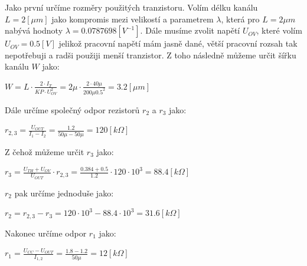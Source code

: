 Jako první určíme rozměry použitých tranzistoru.
Volím délku kanálu \(L = 2 [\mu m]\) jako kompromis mezi velikostí a parametrem \(\lambda\), která pro \(L = 2 \mu m\) nabývá hodnoty \(\lambda = 0.0787698 [V^{-1}]\).
Dále musíme zvolit napětí \(U_{OV}\), které volím \(U_{OV} = 0.5 [V]\) jelikož pracovní napětí mám jasně dané, větší pracovní rozsah tak nepotřebuji a radši použiji menší tranzistor.
Z toho následně můžeme určit šířku kanálu \(W\) jako:

\begin{center}
    \large
    \(
        W = L \cdot \frac{2 \cdot I_T}{KP \cdot U_{OV}^2} = 2\mu \cdot \frac{2 \cdot 40\mu}{200\mu 0.5^2} = 3.2 [\mu m]
    \)
\end{center}

Dále určíme společný odpor rezistorů \(r_2\) a \(r_3\) jako:

\begin{center}
    \large
    \(
        r_{2,3} = \frac{U_{OUT}}{I_1-I_2} = \frac{1.2}{50\mu - 50\mu} = 120 [k\Omega] 
    \)
\end{center}

Z čehož můžeme určit \(r_3\) jako:

\begin{center}
    \large
    \(
        r_3 = \frac{U_{TH}+U_{OV}}{U_{OUT}} \cdot r_{2,3} = \frac{0.384+0.5}{1.2} \cdot 120\cdot 10^{3} = 88.4 [k\Omega]
    \)
\end{center}

\(r_2\) pak určíme jednoduše jako:

\begin{center}
    \large
    \(
        r_2 = r_{2,3} - r_{3} = 120 \cdot 10^{3} - 88.4 \cdot 10^{3} = 31.6 [k\Omega]
    \)
\end{center}

Nakonec určíme odpor \(r_1\) jako:

\begin{center}
    \large
    \(
        r_1 = \frac{U_{CC}-U_{OUT}}{I_{1,2}} = \frac{1.8-1.2}{50\mu} = 12 [k\Omega] 
    \)
\end{center}


